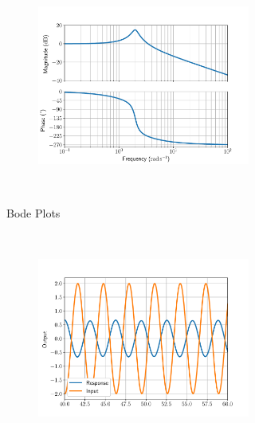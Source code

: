 \documentclass[11pt, reqno]{article}    %
\begin{document}
\begin{figure}[htbp]
\begin{subfigure}{0.4\textwidth}
\begin{subfigure}[htbp]{\textwidth}
            \includegraphics[width=\textwidth]{figures/G3_bode.pdf} 
        \end{subfigure} 
        \caption{Bode Plots}~\label{fig:bode_match}
    \end{subfigure}~\hfill
    \begin{subfigure}{0.4\textwidth}
        \centering
        \begin{subfigure}[htbp]{\textwidth} 
            \includegraphics[width=\textwidth]{figures/G1_sinusoidal.pdf} 
        \end{subfigure}\\
        \begin{subfigure}[htbp]{\textwidth} 

\end{subfigure}
\end{subfigure}
\end{figure}
\end{document}
